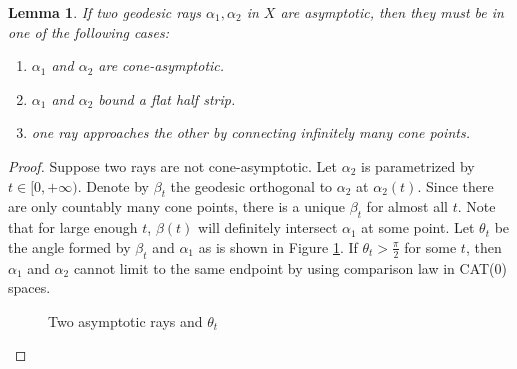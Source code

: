 \documentclass[reqno]{amsart}
\theoremstyle{plain}
\newtheorem{lemma}[thm]{Lemma}
\theoremstyle{definition}
\theoremstyle{remark}
\theoremstyle{definition}
\newcommand{\?}{\textcolor{red}{?}}
\begin{document}
\begin{lemma}\label{asymptotic rays}
If two geodesic rays $\alpha_1,\alpha_2$ in $X$ are asymptotic, then they must be in one of the following cases:
\begin{enumerate}
    \item[(1)]  $\alpha_1$ and $\alpha_2$ are cone-asymptotic.
    \item[(2)] $\alpha_1$ and $\alpha_2$ bound a flat half strip.
    \item[(3)] one ray approaches the other by connecting infinitely many cone points.
\end{enumerate}
\end{lemma}
\begin{proof}
Suppose two rays are not cone-asymptotic. Let $\alpha_2$ is parametrized by $t\in[0,+\infty)$. Denote by $\beta_t$ the geodesic orthogonal to $\alpha_2$ at $\alpha_2(t)$. Since there are only countably many cone points, there is a unique $\beta_t$ for almost all $t$. Note that for large enough $t$, $\beta(t)$ will definitely intersect $\alpha_1$ at some point. Let $\theta_t$ be the angle formed by $\beta_t$ and $\alpha_1$ as is shown in Figure \ref{varying}. If $\theta_t>\frac{\pi}{2}$ for some $t$, then $\alpha_1$ and $\alpha_2$ cannot limit to the same endpoint by using comparison law in CAT(0) spaces.

\begin{figure}[h]
    \centering
    \caption{Two asymptotic rays and $\theta_t$}
    \label{varying}
\end{figure}


\end{proof}
\end{document}
